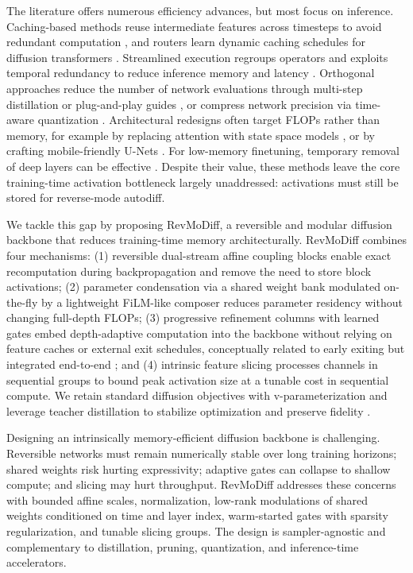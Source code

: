 \documentclass{article}
\begin{document}
The literature offers numerous efficiency advances, but most focus on inference. Caching-based methods reuse intermediate features across timesteps to avoid redundant computation \cite{ma-2023-deepcache,wimbauer-2023-cache}, and routers learn dynamic caching schedules for diffusion transformers \cite{ma-2024-learning}. Streamlined execution regroups operators and exploits temporal redundancy to reduce inference memory and latency \cite{zhan-2024-fast}. Orthogonal approaches reduce the number of network evaluations through multi-step distillation or plug-and-play guides \cite{salimans-2024-multistep,hsiao-2024-plug}, or compress network precision via time-aware quantization \cite{so-2023-temporal}. Architectural redesigns often target FLOPs rather than memory, for example by replacing attention with state space models \cite{yan-2023-diffusion}, or by crafting mobile-friendly U-Nets \cite{li-2023-snapfusion}. For low-memory finetuning, temporary removal of deep layers can be effective \cite{cho-2024-hollowed}. Despite their value, these methods leave the core training-time activation bottleneck largely unaddressed: activations must still be stored for reverse-mode autodiff.

We tackle this gap by proposing RevMoDiff, a reversible and modular diffusion backbone that reduces training-time memory architecturally. RevMoDiff combines four mechanisms: (1) reversible dual-stream affine coupling blocks enable exact recomputation during backpropagation and remove the need to store block activations; (2) parameter condensation via a shared weight bank modulated on-the-fly by a lightweight FiLM-like composer reduces parameter residency without changing full-depth FLOPs; (3) progressive refinement columns with learned gates embed depth-adaptive computation into the backbone without relying on feature caches or external exit schedules, conceptually related to early exiting but integrated end-to-end \cite{moon-2024-simple,ma-2024-learning}; and (4) intrinsic feature slicing processes channels in sequential groups to bound peak activation size at a tunable cost in sequential compute. We retain standard diffusion objectives with v-parameterization and leverage teacher distillation to stabilize optimization and preserve fidelity \cite{dhariwal-2021-diffusion,karras-2022-elucidating,salimans-2024-multistep}.

Designing an intrinsically memory-efficient diffusion backbone is challenging. Reversible networks must remain numerically stable over long training horizons; shared weights risk hurting expressivity; adaptive gates can collapse to shallow compute; and slicing may hurt throughput. RevMoDiff addresses these concerns with bounded affine scales, normalization, low-rank modulations of shared weights conditioned on time and layer index, warm-started gates with sparsity regularization, and tunable slicing groups. The design is sampler-agnostic and complementary to distillation, pruning, quantization, and inference-time accelerators.
\end{document}
